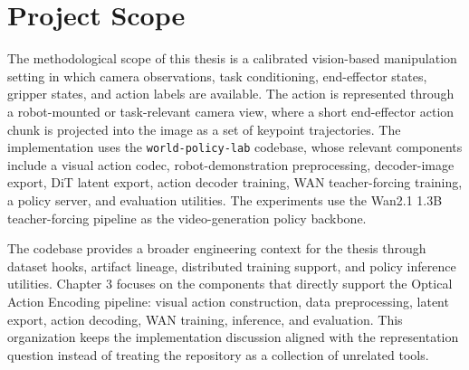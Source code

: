 
\section{Project Scope}


The methodological scope of this thesis is a calibrated vision-based manipulation setting in which camera observations, task conditioning, end-effector states, gripper states, and action labels are available. The action is represented through a robot-mounted or task-relevant camera view, where a short end-effector action chunk is projected into the image as a set of keypoint trajectories. The implementation uses the \texttt{world-policy-lab} codebase, whose relevant components include a visual action codec, robot-demonstration preprocessing, decoder-image export, DiT latent export, action decoder training, WAN teacher-forcing training, a policy server, and evaluation utilities. The experiments use the Wan2.1 1.3B teacher-forcing pipeline as the video-generation policy backbone.

The codebase provides a broader engineering context for the thesis through dataset hooks, artifact lineage, distributed training support, and policy inference utilities. Chapter 3 focuses on the components that directly support the Optical Action Encoding pipeline: visual action construction, data preprocessing, latent export, action decoding, WAN training, inference, and evaluation. This organization keeps the implementation discussion aligned with the representation question instead of treating the repository as a collection of unrelated tools.

